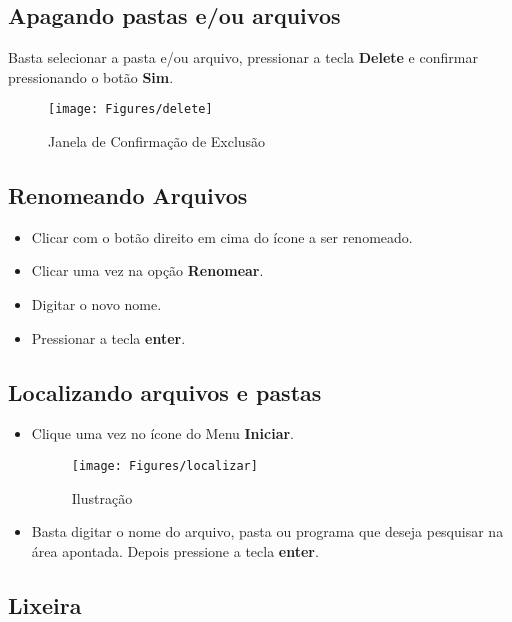 \documentclass[hidelinks,12pt]{article}
\begin{document}
\subsection{Apagando pastas e/ou arquivos}

Basta selecionar a pasta e/ou arquivo, pressionar a tecla {\bf Delete} e confirmar pressionando o botão {\bf Sim}.

	\begin{figure}[!h]
		\centering
		\texttt{[image: Figures/delete]}
		\caption{Janela de Confirmação de Exclusão}
		\label{fig:delete}
	\end{figure}

\subsection{Renomeando Arquivos}

\begin{itemize}
	\item Clicar com o botão direito em cima do ícone a ser renomeado.
	\item Clicar uma vez na opção {\bf Renomear}.
	\item Digitar o novo nome.
	\item Pressionar a tecla {\bf enter}.
\end{itemize}

\subsection{Localizando arquivos e pastas}

\begin{itemize}
	\item Clique uma vez no ícone do Menu {\bf Iniciar}.

	\begin{figure}[!h]
		\centering
		\texttt{[image: Figures/localizar]}
		\caption{Ilustração}
		\label{fig:localizar}
	\end{figure}

	\item  Basta digitar o nome do arquivo, pasta ou programa que deseja pesquisar na área apontada. Depois pressione a tecla {\bf enter}.
\end{itemize}

\subsection{Lixeira}
\end{document}
